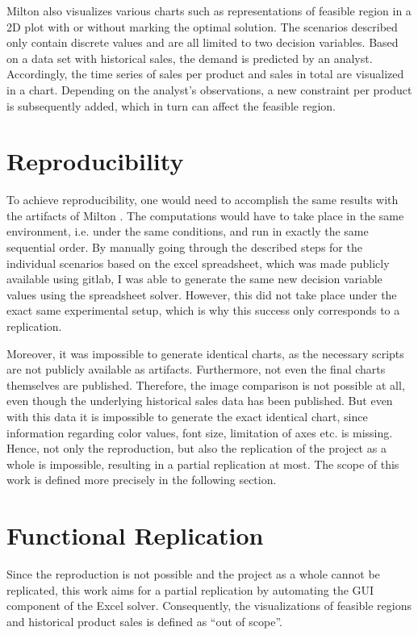 \documentclass[sigconf, nonacm]{acmart}
\begin{document}
Milton \cite{Milton2009} also visualizes various charts such as representations of feasible region in a 2D plot with or without marking the optimal solution. The scenarios described only contain discrete values and are all limited to two decision variables. Based on a data set with historical sales, the demand is predicted by an analyst. Accordingly, the time series of sales per product and sales in total are visualized in a chart. Depending on the analyst's observations, a new constraint per product is subsequently added, which in turn can affect the feasible region.



\section{Reproducibility}
To achieve reproducibility, one would need to accomplish the same results with the artifacts of Milton \cite{Milton2009}. The computations would have to take place in the same environment, i.e. under the same conditions, and run in exactly the same sequential order. By manually going through the described steps for the individual scenarios based on the excel spreadsheet, which was made publicly available using gitlab, I was able to generate the same new decision variable values using the spreadsheet solver. However, this did not take place under the exact same experimental setup, which is why this success only corresponds to a replication.


Moreover, it was impossible to generate identical charts, as the necessary scripts are not publicly available as artifacts. Furthermore, not even the final charts themselves are published. Therefore, the image comparison is not possible at all, even though the underlying historical sales data has been published. But even with this data it is impossible to generate the exact identical chart, since information regarding color values, font size, limitation of axes etc. is missing. Hence, not only the reproduction, but also the replication of the project as a whole is impossible, resulting in a partial replication at most. The scope of this work is defined more precisely in the following section.



\section{Functional Replication}
\label{sec:functional-replication}
Since the reproduction is not possible and the project as a whole cannot be replicated, this work aims for a partial replication by automating the GUI component of the Excel solver. Consequently, the visualizations of feasible regions and historical product sales is defined as ``out of scope''.
\end{document}
